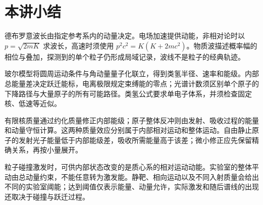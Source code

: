 \section{本讲小结}

德布罗意波长由指定参考系内的动量决定。电场加速提供动能，非相对论时以 $p=\sqrt{2mK}$ 求波长，高速时须使用 $p^2c^2=K(K+2mc^2)$。物质波描述概率幅的相位与叠加，探测到的单个粒子仍形成局域记录，波线不是粒子的经典轨迹。

玻尔模型将圆周运动条件与角动量量子化联立，得到类氢半径、速率和能级。内部总能量差决定跃迁能标，电离极限规定束缚能的零点；光谱计数须区别单个原子的下降路径与大量原子的所有可能路径。类氢公式要求单电子体系，并须检查固定核、低速等近似。

有限核质量通过约化质量修正内部能级；原子整体反冲则由发射、吸收过程的能量和动量守恒计算。这两种质量效应分别属于内部相对运动和整体运动。自由静止原子的发射光子能量低于内部能级差，吸收所需能量高于该差；微小修正应先保留精确关系，再按小量展开。

粒子碰撞激发时，可供内部状态改变的是质心系的相对运动动能。实验室的整体平动由总动量约束，不能任意转为激发能。静靶、相向运动以及不同入射质量会给出不同的实验室阈能；达到阈值仅表示能量、动量允许，实际激发和随后谱线的出现还取决于碰撞与跃迁过程。

